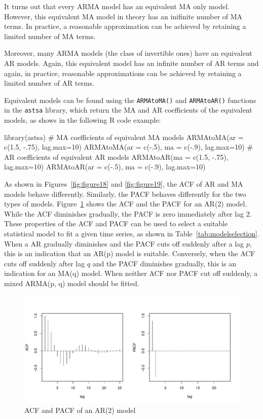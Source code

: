 It turns out that every ARMA model has an equivalent MA only model. However, this equivalent MA model in theory has an inifinite number of MA terms. In practice, a reasonable approximation can be achieved by retaining a limited number of MA terms.

Moreover, many ARMA models (the class of invertible ones) have an equivalent AR models. Again, this equivalent model has an infinite number of AR terms and again, in practice, reasonable approximations can be achieved by retaining a limited number of AR terms.

Equivalent models can be found using the \texttt{ARMAtoMA()} and \texttt{ARMAtoAR()} functions in the \texttt{astsa} library, which return the MA and AR coefficients of the equivalent models, as shows in the following R code example:

\begin{samepage}
\begin{Rcode}
library(astsa)
# MA coefficients of equivalent MA models
ARMAtoMA(ar = c(1.5, -.75), lag.max=10)
ARMAtoMA(ar = c(-.5), ma = c(-.9), lag.max=10)
# AR coefficients of equivalent AR models
ARMAtoAR(ma = c(1.5, -.75), lag.max=10)
ARMAtoAR(ar = c(-.5), ma = c(-.9), lag.max=10)
\end{Rcode}
\end{samepage}

As shown in Figures~\ref{fig:figure18} and \ref{fig:figure19}, the ACF of AR and MA models behave differently. Similarly, the PACF behaves differently for the two types of models. Figure~\ref{fig:figure20} shows the ACF and the PACF for an AR(2) model. While the ACF diminishes gradually, the PACF is zero immediately after lag $2$. These properties of the ACF and PACF can be used to select a suitable statistical model to fit a given time series, as shown in Table~\ref{tab:modelselection}. When a AR gradually diminishes and the PACF cuts off suddenly after a lag $p$, this is an indication that an AR(p) model is suitable. Conversely, when the ACF cuts off suddenly after lag $q$ and the PACF diminishes gradually, this is an indication for an MA(q) model. When neither ACF nor PACF cut off suddenly, a mixed ARMA(p, q) model should be fitted.


\begin{figure}
\centering
\includegraphics[width=.9\textwidth]{figure20.pdf}
\caption{ACF and PACF of an AR(2) model}
\label{fig:figure20}
\end{figure}


